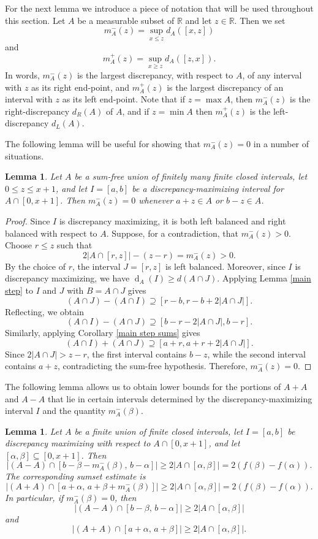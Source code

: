 \documentclass[11pt,reqno]{amsart}
\newtheorem{lem}[thm]{Lemma}
\theoremstyle{definition}
\DeclareMathOperator{\disc}{d}
\def\R{\mathbb{R}}
\def\F#1{f(#1)}
\begin{document}
For the next lemma we introduce a piece of notation that will be used throughout this section. Let $A$ be a measurable subset of $\R$ and let $z\in\R$. Then we set
\[m_A^-(z)=\sup_{x\leq z}d_A([x,z])\]
and
\[m_A^+(z)=\sup_{x\geq z}d_A([z,x]).\]
In words, $m_A^-(z)$ is the largest discrepancy, with respect to $A$, of any interval with $z$ as its right end-point, and $m_A^+(z)$ is the largest discrepancy of an interval with $z$ as its left end-point. Note that if $z=\max A$, then $m_A^-(z)$ is the right-discrepancy $d_R(A)$ of $A$, and if $z=\min A$ then $m_A^+(z)$ is the left-discrepancy $d_L(A)$.

The following lemma will be useful for showing that $m_A^-(z)=0$ in a number of situations.
\begin{lem}\label{mzero}
Let $A$ be a sum-free union of finitely many finite closed intervals, let $0\leq z\leq x+1$, and let $I=[a,b]$ be a discrepancy-maximizing interval for $A\cap[0,x+1]$. Then $m_A^-(z)=0$ whenever $a+z\in A$ or $b-z\in A$.
\end{lem}
\begin{proof}
         Since $I$ is discrepancy maximizing, it is both left balanced and
    right balanced with respect to $A$. Suppose, for a contradiction, that $m_A^-(z)>0$. Choose $r\leq z$ such that
    $$
    2|A\cap [r,z]|-(z-r)=m_A^-(z)>0.
    $$
    By the choice of $r$, the interval $J=[r,z]$ is left balanced. Moreover, since $I$ is discrepancy maximizing, we have $\disc_A(I)\geq d(A\cap J)$. Applying Lemma \ref{main step} to $I$ and $J$ with $B=A\cap J$ gives
$$
    (A\cap J)-(A\cap I)
    \supseteq [r-b,r-b+2|A\cap J|].
$$
Reflecting, we obtain
$$
    (A\cap I)-(A\cap J)
    \supseteq [b-r-2|A\cap J|,b-r].
$$
Similarly, applying Corollary \ref{main step sums} gives
$$
    (A\cap I)+ (A\cap J)
    \supseteq [a+r,a+r+2|A\cap J|].
$$
    Since $2|A\cap J|>z-r$, the first interval contains $b-z$, while the second interval contains $a+z$, contradicting the sum-free hypothesis. Therefore,   $m_A^-(z)=0$.
\end{proof}
The following lemma allows us to obtain lower bounds for the portions of $A+A$ and $A-A$ that lie in certain intervals determined by the discrepancy-maximizing interval $I$ and the quantity $m_A^-(\beta)$.
\begin{lem}\label{minterv}
Let $A$ be a finite union of finite closed intervals, let $I=[a,b]$ be discrepancy maximizing with respect to $A\cap[0,x+1]$,
and let $[\alpha,\beta]\subseteq[0,x+1]$. Then
$$
    |(A-A)\cap [b-\beta-m_A^-(\beta),\, b-\alpha]|
    \geq 2|A\cap[\alpha,\beta]|=2(\F{\beta}-\F{\alpha}).
$$
The corresponding sumset estimate is
$$
    |(A+A)\cap [a+\alpha,\, a+\beta+m_A^-(\beta)]|
    \geq 2|A\cap[\alpha,\beta]|=2(\F{\beta}-\F{\alpha}).
$$
In particular, if $m_A^-(\beta)=0$, then
$$
    |(A-A)\cap [b-\beta,\, b-\alpha]|
    \geq 2|A\cap[\alpha,\beta]|
$$
and
$$
    |(A+A)\cap [a+\alpha,\, a+\beta]|
    \geq 2|A\cap[\alpha,\beta]|.
$$
\end{lem}
\end{document}
